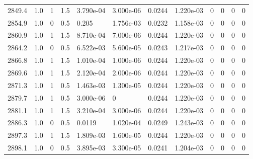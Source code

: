 \documentclass[preview]{standalone}
\begin{document}
{{{{{{{{{{{{{{{{\begin{tabular}{L{1.2cm}C{1.2cm} C{0.3cm}C{0.5cm} C{1.4cm}C{1.4cm} C{1.4cm}C{1.4cm} C{1.6cm}C{1.6cm} C{1.6cm}C{1.6cm}}
  2849.4  &   1.0  & 1     & 1.5 &  3.790e-04  & 3.000e-06  &  0.0244&   1.220e-03& 0 & 0   &  0 & 0  \\ 
  2854.9  &   1.0  & 0     & 0.5 &  0.205  & 1.756e-03  &  0.0232&   1.158e-03& 0 & 0   &  0 & 0  \\ 
  2860.9  &   1.0  & 1     & 1.5 &  8.710e-04  & 7.000e-06  &  0.0244&   1.220e-03& 0 & 0   &  0 & 0  \\ 
  2864.2  &   1.0  & 0     & 0.5 &  6.522e-03  & 5.600e-05  &  0.0243&   1.217e-03& 0 & 0   &  0 & 0  \\ 
  2866.8  &   1.0  & 1     & 1.5 &  1.010e-04  & 1.000e-06  &  0.0244&   1.220e-03& 0 & 0   &  0 & 0  \\ 
  2869.6  &   1.0  & 1     & 1.5 &  2.120e-04  & 2.000e-06  &  0.0244&   1.220e-03& 0 & 0   &  0 & 0  \\ 
  2871.3  &   1.0  & 1     & 0.5 &  1.463e-03  & 1.300e-05  &  0.0244&   1.220e-03& 0 & 0   &  0 & 0  \\ 
  2879.7  &   1.0  & 1     & 0.5 &  3.000e-06  & 0  &  0.0244&   1.220e-03& 0 & 0   &  0 & 0  \\ 
  2881.1  &   1.0  & 1     & 1.5 &  3.210e-04  & 3.000e-06  &  0.0244&   1.220e-03& 0 & 0   &  0 & 0  \\ 
  2886.3  &   1.0  & 0     & 0.5 &  0.0119  & 1.020e-04  &  0.0249&   1.243e-03& 0 & 0   &  0 & 0  \\ 
  2897.3  &   1.0  & 1     & 1.5 &  1.809e-03  & 1.600e-05  &  0.0244&   1.220e-03& 0 & 0   &  0 & 0  \\ 
  2898.1  &   1.0  & 0     & 0.5 &  3.895e-03  & 3.300e-05  &  0.0241&   1.204e-03& 0 & 0   &  0 & 0  \\ 
\hline 
\end{tabular} 

}}}}}}}}}}}}}}}}
\end{document}
